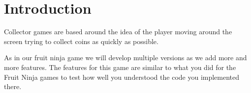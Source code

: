 \documentclass{coderdojo}
\begin{document}
\maketitle

\section*{Introduction}

Collector games are based around the idea of the player moving around the screen trying to collect coins as quickly as possible.

As in our fruit ninja game we will develop multiple versions as we add more and more features. The features for this game are similar to what you did for the Fruit Ninja games to test how well you understood the code you implemented there.
\end{document}
